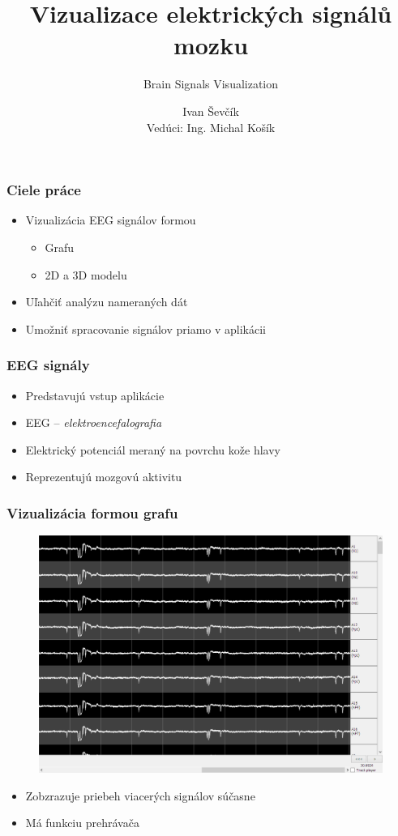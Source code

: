 \documentclass{beamer}
\title{Vizualizace elektrických signálů mozku}
\subtitle{Brain Signals Visualization}
\author[Ivan Ševčík]{Ivan Ševčík\\Vedúci: Ing. Michal Košík}
\date{}
\begin{document}
\maketitle

\begin{frame}
	\frametitle{Ciele práce}
	\begin{itemize}
		\item Vizualizácia EEG signálov formou
		\begin{itemize}
			\item Grafu
			\item 2D a 3D modelu
		\end{itemize}
		\item Uľahčiť analýzu nameraných dát
		\item Umožniť spracovanie signálov priamo v aplikácii
	\end{itemize}
\end{frame}

\begin{frame}
	\frametitle{EEG signály}
	\begin{itemize}
		\item Predstavujú vstup aplikácie
		\item EEG -- \emph{elektroencefalografia}
		\item Elektrický potenciál meraný na povrchu kože hlavy
		\item Reprezentujú mozgovú aktivitu
	\end{itemize}
\end{frame}

\begin{frame}
	\frametitle{Vizualizácia formou grafu}
	\begin{figure}
		\centering
		\includegraphics[width=\linewidth,height=0.5\textheight]{graf.png}
	\end{figure}
	\begin{itemize}
		\item Zobzrazuje priebeh viacerých signálov súčasne
		\item Má funkciu prehrávača
	\end{itemize}
\end{frame}
\end{document}
